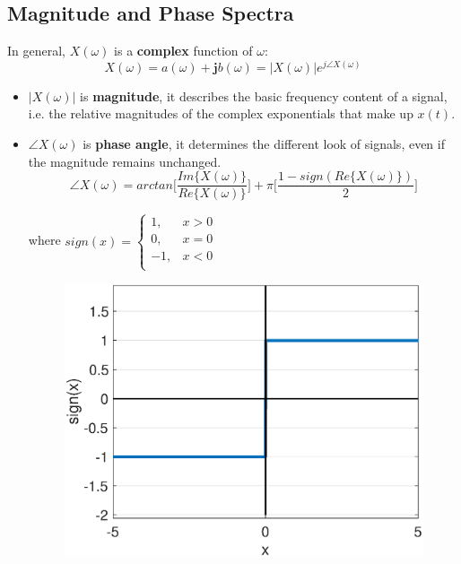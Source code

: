 \subsection{Magnitude and Phase Spectra}
In general, $X(\omega)$ is a \textbf{complex} function of $\omega$:
\[ X(\omega)= a(\omega)+\mathbf{j}b(\omega) = \lvert X(\omega) \rvert e^{j\angle X(\omega)}\]
\begin{itemize}
    \item $\lvert X(\omega) \rvert$ is \textbf{magnitude}, it describes the basic frequency content of a signal, i.e.  the relative magnitudes of the complex exponentials that make up $x(t)$.
    
    \item $\angle X(\omega)$ is \textbf{phase angle}, it  determines the different look of signals, even if the magnitude remains unchanged.
    \[ 
    \angle X(\omega) = arctan\bigg[\frac{Im\{X(\omega)\}}{Re\{X(\omega)\}}\bigg]+\pi \bigg[ \frac{1-sign(Re\{X(\omega)\})}{2} \bigg] 
    \]
    \begin{minipage}{0.4\textwidth}
    where $sign(x)=\begin{cases}
    1, & x>0\\
    0, & x=0\\
    -1, & x<0\\
    \end{cases}$
    \end{minipage}
    \begin{minipage}{0.4\textwidth}
        \begin{figure}[H] 
            \centering
            \includegraphics[width=\textwidth]{images/sign.eps}
        \end{figure}
    \end{minipage}
\end{itemize}

